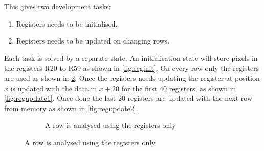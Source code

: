 \documentclass[a4paper, english]{article}
\numberwithin{equation}{section}
\begin{document}
This gives two development tasks:
\begin{enumerate}
    \item Registers needs to be initialised.
    \item Registers needs to be updated on changing rows.
\end{enumerate}
Each task is solved by a separate state. An initialisation state will store pixels in the registers R20 to R59 as shown in \cref{fig:reginit}. On every row only the registers are used as shown in \cref{fig:regcheck}. Once the registers needs updating the register at position \(x\) is updated with the data in \(x+20\) for the first 40 registers, as shown in \cref{fig:regupdate1}. Once done the last 20 registers are updated with the next row from memory as shown in \cref{fig:regupdate2}.
\begin{figure}
    \centering
    \caption{Data register handling}\label{fig:update}
    \begin{subfigure}[t]{.35\textwidth}
        \centering
        \caption{A row is analysed using the registers only}\label{fig:regcheck}
\end{subfigure}
\end{figure}
\end{document}
